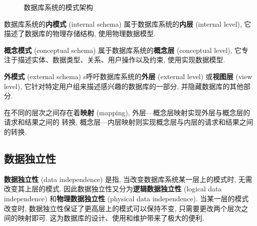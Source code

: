 \documentclass[10pt,UTF8]{book} %
\begin{document}
\begin{figure}[H]
    \caption{数据库系统的模式架构}
    \label{数据库系统的模式架构}
\end{figure}

数据库系统的\textbf{内模式} (internal schema) 属于数据库系统的\textbf{内层} (internal level),
它描述了数据库的物理存储结构, 使用物理数据模型.

\textbf{概念模式} (conceptual schema) 属于数据库系统的\textbf{概念层} (conceptual level),
它专注于描述实体、数据类型、关系、用户操作以及约束, 使用实现数据模型.

\textbf{外模式} (external schema) s呼吁数据库系统的\textbf{外层} (external level)
或\textbf{视图层} (view level), 它针对特定用户组来描述感兴趣的数据库的一部分, 并隐藏数据库的其他部分.

在不同的层次之间存在着\textbf{映射} (mapping), 外层—概念层映射实现外层与概念层的请求和结果之间的
转换, 概念层—内层映射则实现概念层与内层的请求和结果之间的转换.

\subsection{数据独立性}

\textbf{数据独立性} (data independence) 是指, 当改变数据库系统某一层上的模式时,
无需改变其上层的模式. 因此数据独立性又分为\textbf{逻辑数据独立性} (logical data independence)
和\textbf{物理数据独立性} (physical data independence).
当某一层的模式改变时, 数据独立性保证了更高层上的模式可以保持不变, 只需要更改两个层次之间的映射即可.
这为数据库的设计、使用和维护带来了极大的便利.
\end{document}

